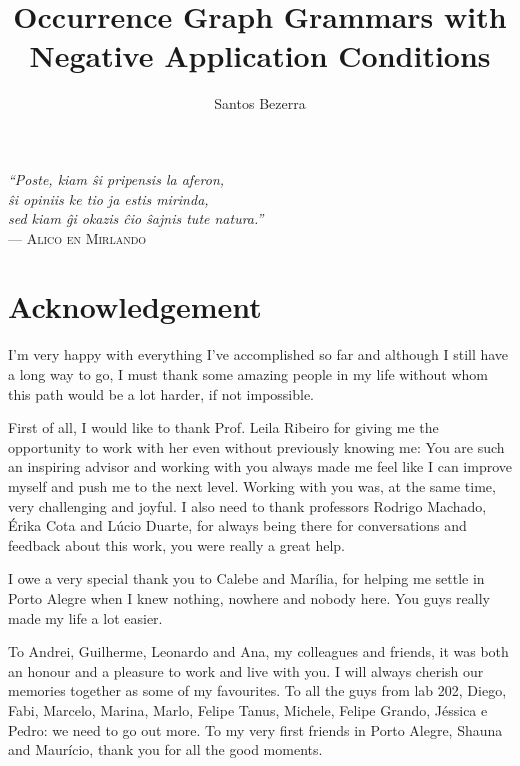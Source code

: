 \documentclass[ppgc,diss,english,openright]{iiufrgs}
\title{Occurrence Graph Grammars with Negative Application Conditions}
\author{Santos Bezerra}{Jonas}
\theoremstyle{plain}
\theoremstyle{definition}
\newcommand{\hide}[1]{}
\begin{document}
\hide{ Template for code snippets
\begin{figure}[!ht]
\caption{Colimit Implementation}
\begin{verbatim}
\end{verbatim}
\label{fig:tests-colimit}
\end{figure}
}

\maketitle
\clearpage

\clearpage
\begin{flushright}
  \mbox{}\vfill
  {\sffamily\itshape
  ``Poste, kiam \^si pripensis la aferon,\\
  \^si opiniis ke tio ja estis mirinda,\\
  sed kiam \^gi okazis \^cio \^sajnis tute natura.''\\}
  --- \textsc{Alico en Mirlando}
\end{flushright}

\chapter*{Acknowledgement}
  I'm very happy with everything I've accomplished so far and although I still have a long way to go, I must thank some amazing people in my life without whom this path would be a lot harder, if not impossible.

  First of all, I would like to thank Prof. Leila Ribeiro for giving me the opportunity to work with her even without previously knowing me: You are such an inspiring advisor and working with you always made me feel like I can improve myself and push me to the next level. Working with you was, at the same time, very challenging and joyful. I also need to thank professors Rodrigo Machado, Érika Cota and Lúcio Duarte, for always being there for conversations and feedback about this work, you were really a great help.

  I owe a very special thank you to Calebe and Marília, for helping me settle in Porto Alegre when I knew nothing, nowhere and nobody here. You guys really made my life a lot easier.

  To Andrei, Guilherme, Leonardo and Ana, my colleagues and friends, it was both an honour and a pleasure to work and live with you. I will always cherish our memories together as some of my favourites. To all the guys from lab 202, Diego, Fabi, Marcelo, Marina, Marlo, Felipe Tanus, Michele, Felipe Grando, Jéssica e Pedro: we need to go out more. To my very first friends in Porto Alegre, Shauna and Maurício, thank you for all the good moments. 
\end{document}

